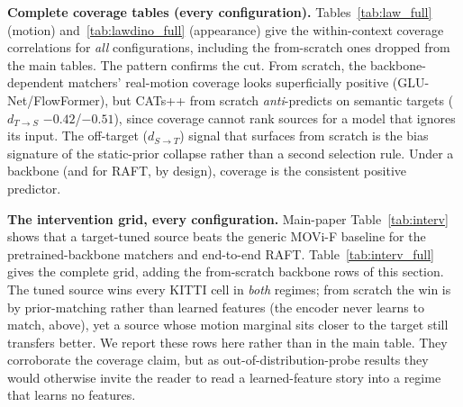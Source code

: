 \documentclass[runningheads]{llncs}
\newcommand{\dtb}{d_{S\to T}}
\newcommand{\dbt}{d_{T\to S}}
\begin{document}
\begin{table}[h]
\centering
\caption{\textbf{Training the backbone from scratch does not beat \emph{not}
training it ($\Delta_{\text{enc}}$).} \emph{Both} encoders start from the same random
initialization, with no pretrained weights anywhere. $\Delta_{\text{enc}}{\le}0$
(\textbf{bold}) means training a random encoder fails to beat leaving it random
(\emph{not} that a pretrained encoder underperforms).}
\label{tab:degenerate}
\small
\setlength{\tabcolsep}{3pt}

\end{table}

\noindent\textbf{Complete coverage tables (every configuration).}
Tables~\ref{tab:law_full} (motion) and~\ref{tab:lawdino_full} (appearance) give
the within-context coverage correlations for \emph{all} configurations, including
the from-scratch ones dropped from the main tables. The pattern
confirms the cut. From scratch, the backbone-dependent matchers' real-motion
coverage looks superficially positive (GLU-Net/FlowFormer), but CATs++ from
scratch \emph{anti}-predicts on semantic targets ($\dbt$ $-0.42$/$-0.51$), since
coverage cannot rank sources for a model that ignores its input. The
off-target ($\dtb$) signal that surfaces from scratch is the bias signature of the
static-prior collapse rather than a second selection rule. Under a backbone (and for
RAFT, by design), coverage is the consistent positive predictor.

\begin{table}[h]
\centering
\caption{\textbf{Motion coverage, every configuration} (main-paper
Table~\ref{tab:law} plus the from-scratch rows). Within-context Spearman $\rho$
(transfer vs.\ $-$distance); $\dbt$ (coverage) in \textbf{bold}.}
\label{tab:law_full}
\scriptsize
\setlength{\tabcolsep}{3pt}

\end{table}

\begin{table}[h]
\centering
\caption{\textbf{Appearance (DINO) control, every configuration} (main-paper
Table~\ref{tab:lawdino} plus the from-scratch rows). No direction carries usable
ranking signal in any regime.}
\label{tab:lawdino_full}
\scriptsize
\setlength{\tabcolsep}{3pt}

\end{table}

\noindent\textbf{The intervention grid, every configuration.} Main-paper
Table~\ref{tab:interv} shows that a target-tuned source beats the generic MOVi-F
baseline for the pretrained-backbone matchers and end-to-end RAFT.
Table~\ref{tab:interv_full} gives the complete grid, adding the from-scratch
backbone rows of this section. The tuned source wins every KITTI cell in
\emph{both} regimes; from scratch the win is by prior-matching rather than
learned features (the encoder never learns to match, above), yet a source whose
motion marginal sits closer to the target still transfers better. We report these
rows here rather than in the main table. They corroborate the coverage claim, but
as out-of-distribution-probe results they would otherwise invite the reader to
read a learned-feature story into a regime that learns no features.
\end{document}
